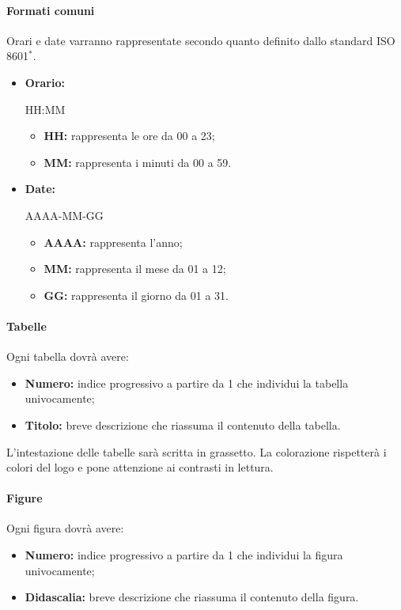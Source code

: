 \documentclass[11pt,a4paper]{article}
\begin{document}
{	\paragraph{Formati comuni\\}
	Orari e date varranno rappresentate secondo quanto definito dallo standard ISO 8601$^*$. 
	
	\begin{itemize}
		\item \textbf{Orario:} 
		\begin{center}
			HH:MM
		\end{center}
		\begin{itemize}
			\item \textbf{HH:} rappresenta le ore da 00 a 23;
			\item \textbf{MM:} rappresenta i minuti da 00 a 59.
		\end{itemize} 
		
		\item \textbf{Date:}
		\begin{center}
			AAAA-MM-GG
		\end{center}
		\begin{itemize}
			\item \textbf{AAAA:} rappresenta l'anno;
			\item \textbf{MM:} rappresenta il mese da 01 a 12;
			\item \textbf{GG:} rappresenta il giorno da 01 a 31.
		\end{itemize}
		
	\end{itemize}
	
	\paragraph{Tabelle\\}	
	Ogni tabella dovrà avere:
	\begin{itemize}
		\item \textbf{Numero:} indice progressivo a partire da 1 che individui la tabella univocamente;
		\item \textbf{Titolo:} breve descrizione che riassuma il contenuto della tabella.
	\end{itemize}
	L'intestazione delle tabelle sarà scritta in grassetto. La colorazione rispetterà i colori del logo e pone attenzione ai contrasti in lettura.
	
	
	
	\paragraph{Figure\\}
	Ogni figura dovrà avere:
	\begin{itemize}
		\item \textbf{Numero:} indice progressivo a partire da 1 che individui la figura univocamente;
		\item \textbf{Didascalia:} breve descrizione che riassuma il contenuto della figura.
	\end{itemize}
	
}
\end{document}
